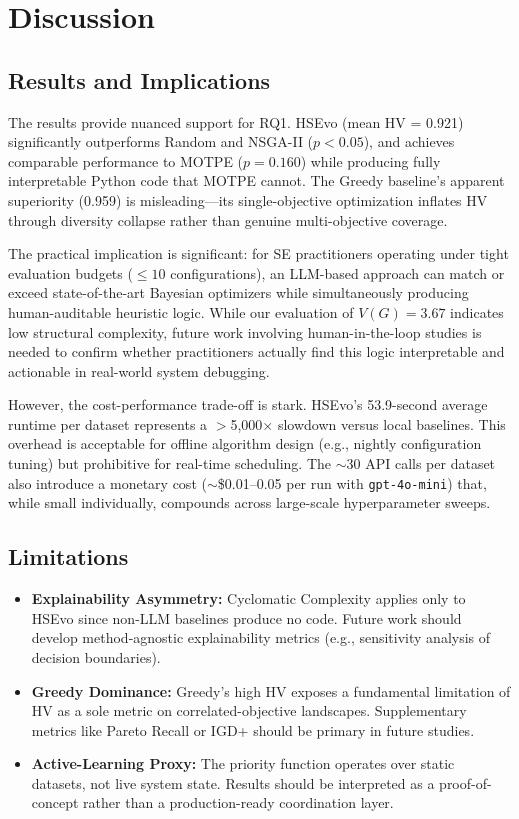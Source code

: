 \documentclass[sigconf,nonacm]{acmart}
\begin{document}
\section{Discussion}

\subsection{Results and Implications}
The results provide nuanced support for RQ1. HSEvo (mean HV = 0.921) significantly outperforms Random and NSGA-II ($p<0.05$), and achieves comparable performance to MOTPE ($p=0.160$) while producing fully interpretable Python code that MOTPE cannot. The Greedy baseline's apparent superiority (0.959) is misleading---its single-objective optimization inflates HV through diversity collapse rather than genuine multi-objective coverage.

The practical implication is significant: for SE practitioners operating under tight evaluation budgets ($\leq 10$ configurations), an LLM-based approach can match or exceed state-of-the-art Bayesian optimizers while simultaneously producing human-auditable heuristic logic. While our evaluation of $V(G) = 3.67$ indicates low structural complexity, future work involving human-in-the-loop studies is needed to confirm whether practitioners actually find this logic interpretable and actionable in real-world system debugging.

However, the cost-performance trade-off is stark. HSEvo's 53.9-second average runtime per dataset represents a $>$5{,}000$\times$ slowdown versus local baselines. This overhead is acceptable for offline algorithm design (e.g., nightly configuration tuning) but prohibitive for real-time scheduling. The $\sim$30 API calls per dataset also introduce a monetary cost ($\sim$\$0.01--0.05 per run with \texttt{gpt-4o-mini}) that, while small individually, compounds across large-scale hyperparameter sweeps.

\subsection{Limitations}
\begin{itemize}
\item \textbf{Explainability Asymmetry:} Cyclomatic Complexity applies only to HSEvo since non-LLM baselines produce no code. Future work should develop method-agnostic explainability metrics (e.g., sensitivity analysis of decision boundaries).
\item \textbf{Greedy Dominance:} Greedy's high HV exposes a fundamental limitation of HV as a sole metric on correlated-objective landscapes. Supplementary metrics like Pareto Recall or IGD+ should be primary in future studies.
\item \textbf{Active-Learning Proxy:} The priority function operates over static datasets, not live system state. Results should be interpreted as a proof-of-concept rather than a production-ready coordination layer.
\end{itemize}
\end{document}
